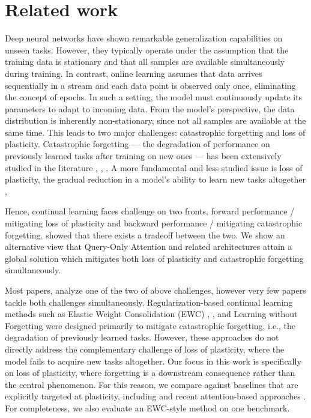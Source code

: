 \documentclass{article}
\begin{document}
\section{Related work}
Deep neural networks have shown remarkable generalization capabilities on unseen tasks. However, they typically operate under the assumption that the training data is stationary and that all samples are available simultaneously during training. In contrast, online learning assumes that data arrives sequentially in a stream and each data point is observed only once, eliminating the concept of epochs.
In such a setting, the model must continuously update its parameters to adapt to incoming data. From the model’s perspective, the data distribution is inherently non-stationary, since not all samples are available at the same time. This leads to two major challenges: catastrophic forgetting and loss of plasticity.
Catastrophic forgetting — the degradation of performance on previously learned tasks after training on new ones — has been extensively studied in the literature \citep{mccloskey1989catastrophic}, \citep{kemker2018measuring}, \citep{ramasesh2021anatomy}.
A more fundamental and less studied issue is loss of plasticity, the gradual reduction in a model’s ability to learn new tasks altogether \citep{dohare2024loss}, \citep{mirzadeh2020understanding}

Hence, continual learning faces challenge on two fronts, forward performance / mitigating loss of plasticity and backward performance / mitigating catastrophic forgetting. \citep{chen2023stability} showed that
there exists a tradeoff between the two. We show an alternative view that 
Query-Only Attention and related architectures attain a global solution which mitigates both loss of plasticity and catastrophic forgetting simultaneously.


Most papers, analyze one of the two of above challenges, however very few papers tackle both challenges simultaneously.
Regularization-based continual learning methods such as Elastic Weight Consolidation (EWC) \citep{kirkpatrick2017overcoming}, \citep{zenke2017si}, and Learning without Forgetting \citep{li2016lwf} were designed primarily to mitigate catastrophic forgetting, i.e., the degradation of previously learned tasks. However, these approaches do not directly address the complementary challenge of loss of plasticity, where the model fails to acquire new tasks altogether. Our focus in this work is specifically on loss of plasticity, where forgetting is a downstream consequence rather than the central phenomenon. For this reason, we compare against baselines that are explicitly targeted at plasticity, including \citep{dohare2024loss} and recent attention-based approaches \citep{wang2025replay}. For completeness, we also evaluate an EWC-style method on one benchmark.
\end{document}
